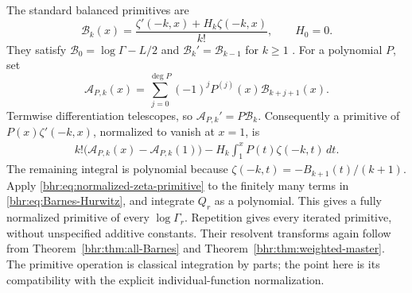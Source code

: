 The standard balanced primitives are
\begin{equation}\label{bhr:eq:balanced-B}
 \mathscr B_k(x)=\frac{\zeta'(-k,x)+H_k\zeta(-k,x)}{k!},
 \qquad H_0=0.
\end{equation}
They satisfy $\mathscr B_0=\log\Gamma-L/2$ and
$\mathscr B_k'=\mathscr B_{k-1}$ for $k\ge1$
\cite{bhr:EMIntegrals,bhr:EMGeneralized}. For a polynomial $P$, set
\begin{equation}\label{bhr:eq:weighted-antiderivative}
 \mathscr A_{P,k}(x)=
    \sum_{j=0}^{\deg P}(-1)^jP^{(j)}(x)\mathscr B_{k+j+1}(x).
\end{equation}
Termwise differentiation telescopes, so
$\mathscr A_{P,k}'=P\mathscr B_k$.
Consequently a primitive of $P(x)\zeta'(-k,x)$, normalized
to vanish at $x=1$, is
\begin{align}\label{bhr:eq:normalized-zeta-primitive}
 k!\bigl(\mathscr A_{P,k}(x)-\mathscr A_{P,k}(1)\bigr)
    -H_k\int_1^xP(t)\zeta(-k,t)\,dt.
\end{align}
The remaining integral is polynomial because
$\zeta(-k,t)=-B_{k+1}(t)/(k+1)$.
Apply \eqref{bhr:eq:normalized-zeta-primitive} to the finitely many
terms in \eqref{bhr:eq:Barnes-Hurwitz}, and integrate $Q_r$ as a
polynomial. This gives a fully normalized primitive of every
$\log\Gamma_r$. Repetition gives every iterated primitive,
without unspecified additive constants. Their resolvent
transforms again follow from Theorem~\ref{bhr:thm:all-Barnes} and
Theorem~\ref{bhr:thm:weighted-master}. The primitive operation is
classical integration by parts; the point here is its compatibility
with the explicit individual-function normalization.
